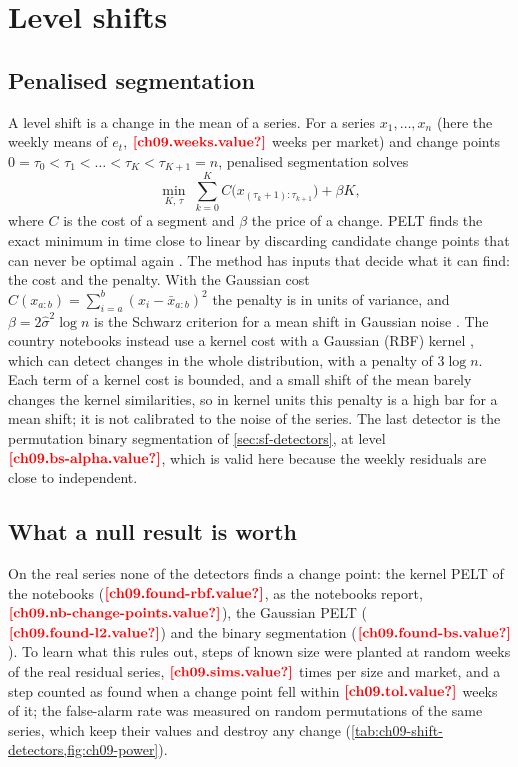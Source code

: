 \section{Level shifts}\label{sec:cp-shifts}

\subsection{Penalised segmentation}

A level shift is a change in the mean of a series. For a series $x_1, \dots, x_n$ (here the weekly means of $e_t$,
$\est{ch09.weeks}{value}$ weeks per market) and change points $0 = \tau_0 < \tau_1 < \dots < \tau_K < \tau_{K+1} = n$,
penalised segmentation solves
\begin{equation}\label{eq:cp-penalised}
  \min_{K,\,\tau} \; \sum_{k=0}^{K} C\bigl(x_{(\tau_k + 1) : \tau_{k+1}}\bigr) + \beta K ,
\end{equation}
where $C$ is the cost of a segment and $\beta$ the price of a change. PELT finds the exact minimum in time close to
linear by discarding candidate change points that can never be optimal again \autocite{killick2012}. The method has
inputs that decide what it can find: the cost and the penalty. With the Gaussian cost $C(x_{a:b}) = \sum_{i=a}^{b} (x_i - \bar x_{a:b})^2$ the
penalty is in units of variance, and $\beta = 2 \hat\sigma^2 \log n$ is the Schwarz criterion for a mean shift in
Gaussian noise \autocite{schwarz1978}. The country notebooks instead use a kernel cost with a Gaussian (RBF) kernel
\autocite{arlot2019}, which can detect changes in the whole distribution, with a penalty of $3 \log n$. Each term of a
kernel cost is bounded, and a small shift of the mean barely changes the kernel similarities, so in kernel units this
penalty is a high bar for a mean shift; it is not calibrated to the noise of the series. The last detector is the
permutation binary segmentation of \cref{sec:sf-detectors}, at level $\est{ch09.bs-alpha}{value}$, which is valid here
because the weekly residuals are close to independent.

\subsection{What a null result is worth}

On the real series none of the detectors finds a change point: the kernel PELT of the notebooks
($\est{ch09.found-rbf}{value}$, as the notebooks report, $\est{ch09.nb-change-points}{value}$), the Gaussian PELT
($\est{ch09.found-l2}{value}$) and the binary segmentation ($\est{ch09.found-bs}{value}$). To learn what this rules
out, steps of known size were planted at random weeks of the real residual series, $\est{ch09.sims}{value}$ times per size
and market, and a step counted as found when a change point fell within $\est{ch09.tol}{value}$ weeks of it; the
false-alarm rate was measured on random permutations of the same series, which keep their values and destroy any
change (\cref{tab:ch09-shift-detectors,fig:ch09-power}).


